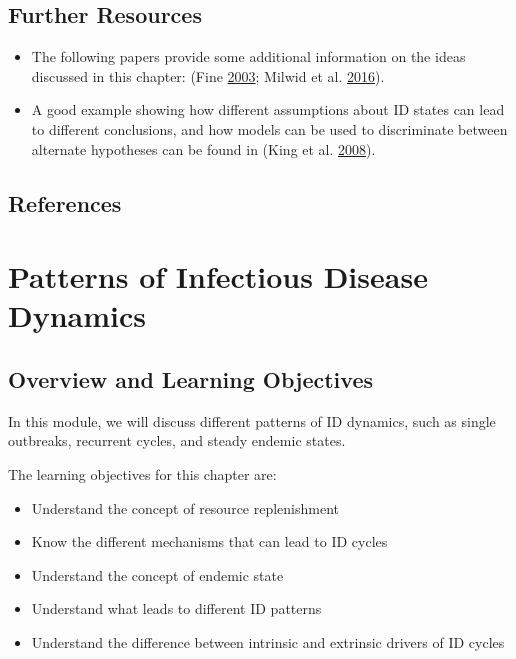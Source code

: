 \documentclass[]{book}
\providecommand{\tightlist}{%
  \setlength{\itemsep}{0pt}\setlength{\parskip}{0pt}}
\theoremstyle{definition}
\theoremstyle{definition}
\theoremstyle{definition}
\theoremstyle{remark}
\begin{document}
\section{Further Resources}\label{further-resources-1}

\begin{itemize}
\tightlist
\item
  The following papers provide some additional information on the ideas
  discussed in this chapter: (Fine \protect\hyperlink{ref-fine03}{2003};
  Milwid et al. \protect\hyperlink{ref-milwid16}{2016}).
\item
  A good example showing how different assumptions about ID states can
  lead to different conclusions, and how models can be used to
  discriminate between alternate hypotheses can be found in (King et al.
  \protect\hyperlink{ref-king08}{2008}).
\end{itemize}

\section{References}\label{references-2}

\chapter{Patterns of Infectious Disease
Dynamics}\label{patterns-of-infectious-disease-dynamics}

\section{Overview and Learning
Objectives}\label{overview-and-learning-objectives-2}

In this module, we will discuss different patterns of ID dynamics, such
as single outbreaks, recurrent cycles, and steady endemic states.

The learning objectives for this chapter are:

\begin{itemize}
\tightlist
\item
  Understand the concept of resource replenishment
\item
  Know the different mechanisms that can lead to ID cycles
\item
  Understand the concept of endemic state
\item
  Understand what leads to different ID patterns
\item
  Understand the difference between intrinsic and extrinsic drivers of
  ID cycles
\end{itemize}
\end{document}
